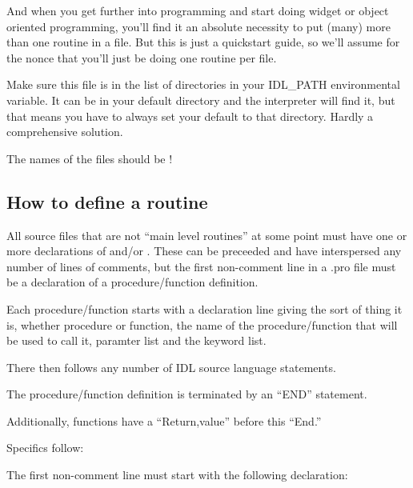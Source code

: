      And when you get further into programming and start doing widget
     or object oriented programming, you'll find it an absolute
     necessity to put (many) more than one routine in a file. But this
     is just a quickstart guide, so we'll assume for the nonce that
     you'll just be doing one routine per file.

     \item Make sure this file is in the list of directories in your
     IDL\_PATH environmental variable. It can be in your default
     directory and the interpreter will find it, but that means you
     have to always set your default to that directory. Hardly a
     comprehensive solution.

     \item The names of the files should be !

  \ee


     
\subsection{How to define a routine}\label{sec:qs-Defining-Routines}

  
  All source files that are not ``main level routines'' at some point
  must have one or more declarations of  and/or
  . These can be preceeded and have interspersed any number
  of lines of comments, but the first non-comment line in a .pro file
  must be a declaration of a procedure/function definition.

  Each procedure/function starts with a declaration line giving the
  sort of thing it is, whether procedure or function, the name of the
  procedure/function that will be used to call it, paramter list and
  the keyword list.

  There then follows any number of IDL source language statements. 

  The procedure/function definition is terminated by an ``END'' statement.

  Additionally, functions have a ``Return,value'' before this ``End.''

  Specifics follow:


  \bi
    \item {}

        The first non-comment line must start with the following declaration:


